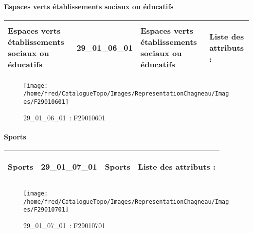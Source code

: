 \documentclass[12pt,titlepage,oneside]{book}
\begin{document}
\paragraph{Espaces verts établissements sociaux ou éducatifs}
\noindent
\vspace{\baselineskip}

\renewcommand{\arraystretch}{1.2}
\begin{supertabular}{|p{10cm}|c|p{13cm}|p{12cm}|}
 Espaces verts établissements sociaux ou éducatifs & 29\_01\_06\_01 & Espaces verts établissements sociaux ou éducatifs & Liste des attributs :
\begin{enumerate}
\end{enumerate}
\\
\hline
\end{supertabular}
\begin{figure}[h!]
  \hfill         %
  \begin{minipage}[t]{3cm}
    \begin{center}
      \texttt{[image: /home/fred/CatalogueTopo/Images/RepresentationChagneau/Images/F29010601]}
      \caption[~29\_01\_06\_01]{\small{29\_01\_06\_01~:} \tiny{F29010601}}\label{F29010601}
    \end{center}
  \end{minipage}
\end{figure}


\paragraph{Sports}
\noindent
\vspace{\baselineskip}

\renewcommand{\arraystretch}{1.2}
\begin{supertabular}{|p{10cm}|c|p{13cm}|p{12cm}|}
 Sports & 29\_01\_07\_01 & Sports & Liste des attributs :
\begin{enumerate}
\end{enumerate}
\\
\hline
\end{supertabular}
\begin{figure}[h!]
  \hfill         %
  \begin{minipage}[t]{3cm}
    \begin{center}
      \texttt{[image: /home/fred/CatalogueTopo/Images/RepresentationChagneau/Images/F29010701]}
      \caption[~29\_01\_07\_01]{\small{29\_01\_07\_01~:} \tiny{F29010701}}\label{F29010701}
    \end{center}
  \end{minipage}
\end{figure}
\end{document}
